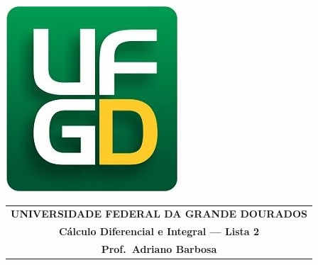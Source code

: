 \documentclass[a4paper]{article}
\begin{document}
%
%
\thispagestyle{empty}
\pagestyle{empty}
\begin{minipage}[h]{0.14\textwidth}
	\includegraphics[scale=0.24]{../../ufgd.png}
\end{minipage}
\begin{minipage}[h]{\textwidth}
    \begin{tabular}{c}
        {{\bf UNIVERSIDADE FEDERAL DA GRANDE DOURADOS}}\\
        {{\bf C\'alculo Diferencial e Integral --- Lista 2}}\\
        {{\bf Prof.\ Adriano Barbosa}}\\
    \end{tabular}
    \vspace{-0.45cm}
\end{minipage}

\vspace{1cm}
\end{document}
